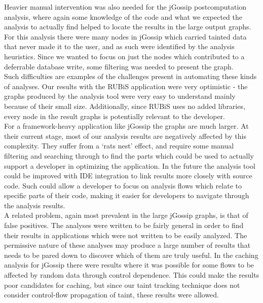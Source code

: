 \documentclass[msc,oneside]{ubcthesis}
\begin{document}
Heavier manual intervention was also needed for the jGossip postcomputation analysis, where again some knowledge of the code and what we expected the analysis to actually find helped to locate the results in the large output graphs. For this analysis there were many nodes in jGossip which carried tainted data that never made it to the user, and as such were identified by the analysis heuristics. Since we wanted to focus on just the nodes which contributed to a deferrable database write, some filtering was needed to present the graph.\\

Such difficulties are examples of the challenges present in automating these kinds of analyses. Our results with the RUBiS application were very optimistic - the graphs produced by the analysis tool were very easy to understand mainly because of their small size. Additionally, since RUBiS uses no added libraries, every node in the result graphs is potentially relevant to the developer.\\

For a framework-heavy application like jGossip the graphs are much larger. At their current stage, most of our analysis results are negatively affected by this complexity. They suffer from a `rats nest' effect, and require some manual filtering and searching through to find the parts which could be used to actually support a developer in optimizing the application. In the future the analysis tool could be improved with IDE integration to link results more closely with source code. Such could allow a developer to focus on analysis flows which relate to specific parts of their code, making it easier for developers to navigate through the analysis results.\\

A related problem, again most prevalent in the large jGossip graphs, is that of false positives. The analyses were written to be fairly general in order to find their results in applications which were not written to be easily analyzed. The permissive nature of these analyses may produce a large number of results that needs to be pared down to discover which of them are truly useful. In the caching analysis for jGossip there were results where it was possible for some flows to be affected by random data through control dependence. This could make the results poor candidates for caching, but since our taint tracking technique does not consider control-flow propagation of taint, these results were allowed.\\
\end{document}
